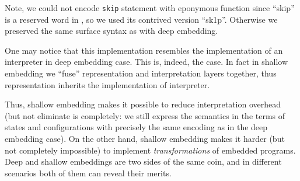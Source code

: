 Note, we could not encode \lstinline|skip| statement with eponymous function since ``skip'' is a reserved word in \lama, so we used
its contrived version ``sk1p''. Otherwise we preserved the same surface syntax as with deep embedding.

One may notice that this implementation resembles the implementation of an interpreter in deep embedding case. This is, indeed, the
case. In fact in shallow embedding we ``fuse'' representation and interpretation layers together, thus representation
inherits the implementation of interpreter.

Thus, shallow embedding makes it possible to reduce interpretation overhead (but not eliminate is completely: we still
express the semantics in the terms of states and configurations with precisely the same encoding as in the
deep embedding case). On the other hand, shallow embedding makes it harder (but not completely impossible) to
implement \emph{transformations} of embedded programs. Deep and shallow embeddings are two sides of the same coin, and
in different scenarios both of them can reveal their merits.
